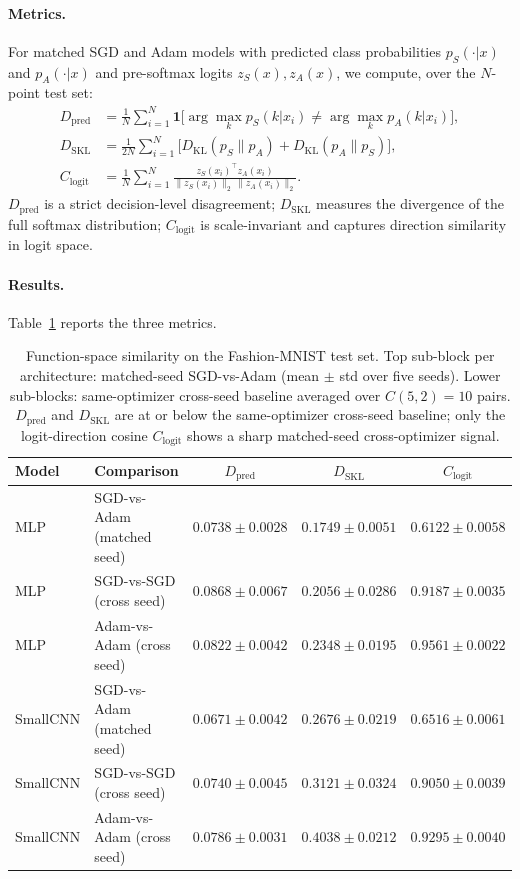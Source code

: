 \documentclass[11pt]{article}
\begin{document}
\paragraph{Metrics.} For matched SGD and Adam models with predicted class probabilities $p_S(\cdot|x)$ and $p_A(\cdot|x)$ and pre-softmax logits $z_S(x), z_A(x)$, we compute, over the $N$-point test set:
\begin{align}
D_{\mathrm{pred}} &= \frac{1}{N}\sum_{i=1}^N \mathbf{1}\!\big[\arg\max_k p_S(k|x_i)\ne \arg\max_k p_A(k|x_i)\big],\\
D_{\mathrm{SKL}} &= \frac{1}{2N}\sum_{i=1}^N \big[D_{\mathrm{KL}}(p_S\|p_A) + D_{\mathrm{KL}}(p_A\|p_S)\big],\\
C_{\mathrm{logit}} &= \frac{1}{N}\sum_{i=1}^N \frac{z_S(x_i)^\top z_A(x_i)}{\|z_S(x_i)\|_2\,\|z_A(x_i)\|_2}.
\end{align}
$D_{\mathrm{pred}}$ is a strict decision-level disagreement; $D_{\mathrm{SKL}}$ measures the divergence of the full softmax distribution; $C_{\mathrm{logit}}$ is scale-invariant and captures direction similarity in logit space.

\paragraph{Results.} Table~\ref{tab:function-space} reports the three metrics.

\begin{table}[H]
\centering
\small
\begin{tabular}{llccc}
\toprule
\textbf{Model} & \textbf{Comparison} & $D_{\mathrm{pred}}$ & $D_{\mathrm{SKL}}$ & $C_{\mathrm{logit}}$ \\
\midrule
MLP      & SGD-vs-Adam (matched seed) & $0.0738 \pm 0.0028$ & $0.1749 \pm 0.0051$ & $0.6122 \pm 0.0058$ \\
MLP      & SGD-vs-SGD (cross seed)    & $0.0868 \pm 0.0067$ & $0.2056 \pm 0.0286$ & $0.9187 \pm 0.0035$ \\
MLP      & Adam-vs-Adam (cross seed)  & $0.0822 \pm 0.0042$ & $0.2348 \pm 0.0195$ & $0.9561 \pm 0.0022$ \\
\addlinespace
SmallCNN & SGD-vs-Adam (matched seed) & $0.0671 \pm 0.0042$ & $0.2676 \pm 0.0219$ & $0.6516 \pm 0.0061$ \\
SmallCNN & SGD-vs-SGD (cross seed)    & $0.0740 \pm 0.0045$ & $0.3121 \pm 0.0324$ & $0.9050 \pm 0.0039$ \\
SmallCNN & Adam-vs-Adam (cross seed)  & $0.0786 \pm 0.0031$ & $0.4038 \pm 0.0212$ & $0.9295 \pm 0.0040$ \\
\bottomrule
\end{tabular}
\caption{Function-space similarity on the Fashion-MNIST test set. Top sub-block per architecture: matched-seed SGD-vs-Adam (mean $\pm$ std over five seeds). Lower sub-blocks: same-optimizer cross-seed baseline averaged over $C(5,2)=10$ pairs. $D_{\mathrm{pred}}$ and $D_{\mathrm{SKL}}$ are at or below the same-optimizer cross-seed baseline; only the logit-direction cosine $C_{\mathrm{logit}}$ shows a sharp matched-seed cross-optimizer signal.}
\label{tab:function-space}
\end{table}
\end{document}
